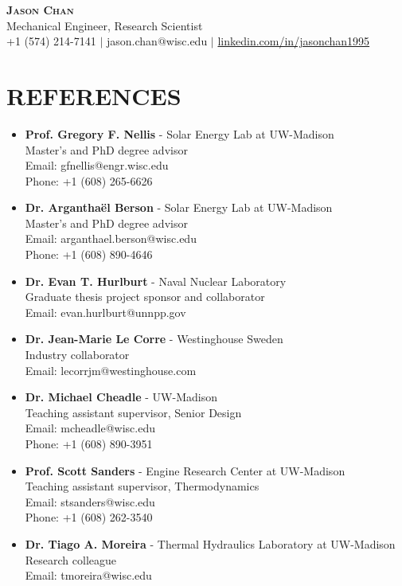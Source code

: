 \documentclass[letterpaper,11pt]{article}
\begin{document}


\begin{center}
    \textbf{\LARGE \scshape Jason Chan} \\
    \vspace{1mm}
    Mechanical Engineer, Research Scientist\\ %
    \small +1 (574) 214-7141  $|$ jason.chan$@$wisc.edu $|$ \href{https://www.linkedin.com/in/jasonchan1995}{linkedin.com/in/jasonchan1995}
\end{center}

\section{REFERENCES}
\begin{itemize}
\itemsep0em 
  \item[] \small \textbf{Prof. Gregory F. Nellis} - Solar Energy Lab at UW-Madison\\
  Master's and PhD degree advisor \\
  Email: gfnellis@engr.wisc.edu \\
  Phone: +1 (608) 265-6626
  \item[] \small \textbf{Dr. Arganthaël Berson} - Solar Energy Lab at UW-Madison\\
  Master's and PhD degree advisor\\
  Email: arganthael.berson@wisc.edu \\
  Phone: +1 (608) 890-4646
  \item[] \small \textbf{Dr. Evan T. Hurlburt} - Naval Nuclear Laboratory\\
  Graduate thesis project sponsor and collaborator\\
  Email: evan.hurlburt@unnpp.gov
  \item[] \small \textbf{Dr. Jean-Marie Le Corre} - Westinghouse Sweden\\
  Industry collaborator \\
  Email: lecorrjm@westinghouse.com
  \item[] \small \textbf{Dr. Michael Cheadle} - UW-Madison\\
  Teaching assistant supervisor, Senior Design\\
  Email: mcheadle@wisc.edu \\
  Phone: +1 (608) 890-3951
  \item[] \small \textbf{Prof. Scott Sanders} - Engine Research Center at UW-Madison\\
  Teaching assistant supervisor, Thermodynamics\\
  Email: stsanders@wisc.edu \\
  Phone: +1 (608) 262-3540
  \item[] \small \textbf{Dr. Tiago A. Moreira} - Thermal Hydraulics Laboratory at UW-Madison\\
  Research colleague\\
  Email: tmoreira@wisc.edu
\end{itemize}
\end{document}

